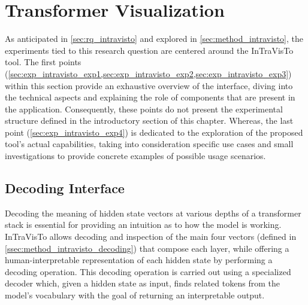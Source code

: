 \section{Transformer Visualization}\label{sec:exp_intravisto}

As anticipated in \cref{sec:rq_intravisto} and explored in \cref{sec:method_intravisto}, the experiments tied to this research question are centered around the InTraVisTo tool.
The first points (\cref{sec:exp_intravisto_exp1,sec:exp_intravisto_exp2,sec:exp_intravisto_exp3}) within this section provide an exhaustive overview of the interface, diving into the technical aspects and explaining the role of components that are present in the application.
Consequently, these points do not present the experimental structure defined in the introductory section of this chapter.
Whereas, the last point (\cref{sec:exp_intravisto_exp4}) is dedicated to the exploration of the proposed tool's actual capabilities, taking into consideration specific use cases and small investigations to provide concrete examples of possible usage scenarios.

\subsection{Decoding Interface}\label{sec:exp_intravisto_exp1}

Decoding the meaning of hidden state vectors at various depths of a transformer stack is essential for providing an intuition as to how the model is working.
InTraVisTo allows decoding and inspection of the main four vectors (defined in \cref{ssec:method_intravisto_decoding}) that compose each layer, while offering a human-interpretable representation of each hidden state by performing a decoding operation.
This decoding operation is carried out using a specialized decoder which, given a hidden state as input, finds related tokens from the model's vocabulary with the goal of returning an interpretable output.

